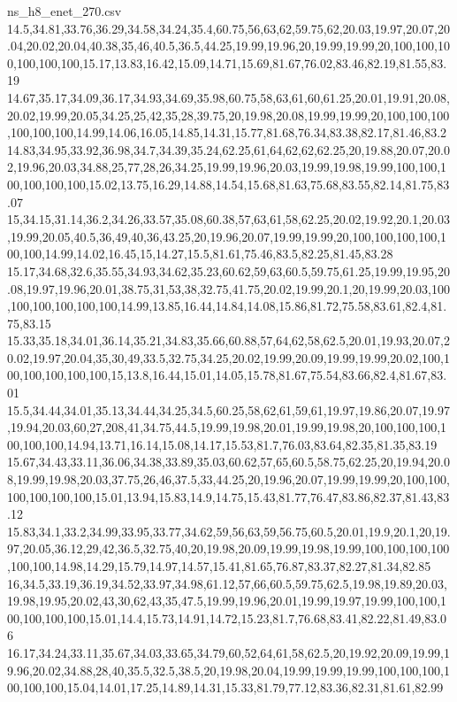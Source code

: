 \begin{filecontents*}[overwrite]{ns_h8_enet_270.csv}
14.5,34.81,33.76,36.29,34.58,34.24,35.4,60.75,56,63,62,59.75,62,20.03,19.97,20.07,20.04,20.02,20.04,40.38,35,46,40.5,36.5,44.25,19.99,19.96,20,19.99,19.99,20,100,100,100,100,100,100,15.17,13.83,16.42,15.09,14.71,15.69,81.67,76.02,83.46,82.19,81.55,83.19
14.67,35.17,34.09,36.17,34.93,34.69,35.98,60.75,58,63,61,60,61.25,20.01,19.91,20.08,20.02,19.99,20.05,34.25,25,42,35,28,39.75,20,19.98,20.08,19.99,19.99,20,100,100,100,100,100,100,14.99,14.06,16.05,14.85,14.31,15.77,81.68,76.34,83.38,82.17,81.46,83.2
14.83,34.95,33.92,36.98,34.7,34.39,35.24,62.25,61,64,62,62,62.25,20,19.88,20.07,20.02,19.96,20.03,34.88,25,77,28,26,34.25,19.99,19.96,20.03,19.99,19.98,19.99,100,100,100,100,100,100,15.02,13.75,16.29,14.88,14.54,15.68,81.63,75.68,83.55,82.14,81.75,83.07
15,34.15,31.14,36.2,34.26,33.57,35.08,60.38,57,63,61,58,62.25,20.02,19.92,20.1,20.03,19.99,20.05,40.5,36,49,40,36,43.25,20,19.96,20.07,19.99,19.99,20,100,100,100,100,100,100,14.99,14.02,16.45,15,14.27,15.5,81.61,75.46,83.5,82.25,81.45,83.28
15.17,34.68,32.6,35.55,34.93,34.62,35.23,60.62,59,63,60.5,59.75,61.25,19.99,19.95,20.08,19.97,19.96,20.01,38.75,31,53,38,32.75,41.75,20.02,19.99,20.1,20,19.99,20.03,100,100,100,100,100,100,14.99,13.85,16.44,14.84,14.08,15.86,81.72,75.58,83.61,82.4,81.75,83.15
15.33,35.18,34.01,36.14,35.21,34.83,35.66,60.88,57,64,62,58,62.5,20.01,19.93,20.07,20.02,19.97,20.04,35,30,49,33.5,32.75,34.25,20.02,19.99,20.09,19.99,19.99,20.02,100,100,100,100,100,100,15,13.8,16.44,15.01,14.05,15.78,81.67,75.54,83.66,82.4,81.67,83.01
15.5,34.44,34.01,35.13,34.44,34.25,34.5,60.25,58,62,61,59,61,19.97,19.86,20.07,19.97,19.94,20.03,60,27,208,41,34.75,44.5,19.99,19.98,20.01,19.99,19.98,20,100,100,100,100,100,100,14.94,13.71,16.14,15.08,14.17,15.53,81.7,76.03,83.64,82.35,81.35,83.19
15.67,34.43,33.11,36.06,34.38,33.89,35.03,60.62,57,65,60.5,58.75,62.25,20,19.94,20.08,19.99,19.98,20.03,37.75,26,46,37.5,33,44.25,20,19.96,20.07,19.99,19.99,20,100,100,100,100,100,100,15.01,13.94,15.83,14.9,14.75,15.43,81.77,76.47,83.86,82.37,81.43,83.12
15.83,34.1,33.2,34.99,33.95,33.77,34.62,59,56,63,59,56.75,60.5,20.01,19.9,20.1,20,19.97,20.05,36.12,29,42,36.5,32.75,40,20,19.98,20.09,19.99,19.98,19.99,100,100,100,100,100,100,14.98,14.29,15.79,14.97,14.57,15.41,81.65,76.87,83.37,82.27,81.34,82.85
16,34.5,33.19,36.19,34.52,33.97,34.98,61.12,57,66,60.5,59.75,62.5,19.98,19.89,20.03,19.98,19.95,20.02,43,30,62,43,35,47.5,19.99,19.96,20.01,19.99,19.97,19.99,100,100,100,100,100,100,15.01,14.4,15.73,14.91,14.72,15.23,81.7,76.68,83.41,82.22,81.49,83.06
16.17,34.24,33.11,35.67,34.03,33.65,34.79,60,52,64,61,58,62.5,20,19.92,20.09,19.99,19.96,20.02,34.88,28,40,35.5,32.5,38.5,20,19.98,20.04,19.99,19.99,19.99,100,100,100,100,100,100,15.04,14.01,17.25,14.89,14.31,15.33,81.79,77.12,83.36,82.31,81.61,82.99

\end{filecontents*}

